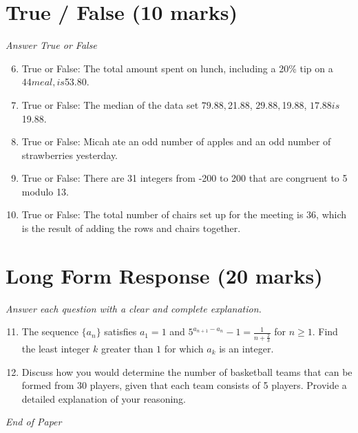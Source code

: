 \documentclass[12pt]{article}
\begin{document}
\section*{True / False (10 marks)}
\textit{Answer True or False}
\begin{enumerate}[label=\arabic*.]
\setcounter{enumi}{5}
\item True or False: The total amount spent on lunch, including a 20\% tip on a $44 meal, is $53.80.
\item True or False: The median of the data set $79.88, $21.88, $29.88, $19.88, $17.88 is $19.88.
\item True or False: Micah ate an odd number of apples and an odd number of strawberries yesterday.
\item True or False: There are 31 integers from -200 to 200 that are congruent to 5 modulo 13.
\item True or False: The total number of chairs set up for the meeting is 36, which is the result of adding the rows and chairs together.
\end{enumerate}

\section*{Long Form Response (20 marks)}
\textit{Answer each question with a clear and complete explanation.}
\begin{enumerate}[label=\arabic*.]
\setcounter{enumi}{10}
\item The sequence $\{a_n\}$ satisfies $a_1 = 1$ and $5^{a_{n + 1} - a_n} - 1 = \frac {1}{n + \frac {2}{3}}$ for $n \geq 1$. Find the least integer $k$ greater than $1$ for which $a_k$ is an integer.
\item Discuss how you would determine the number of basketball teams that can be formed from 30 players, given that each team consists of 5 players. Provide a detailed explanation of your reasoning.
\end{enumerate}

\vfill
\noindent\textit{End of Paper}
\end{document}
